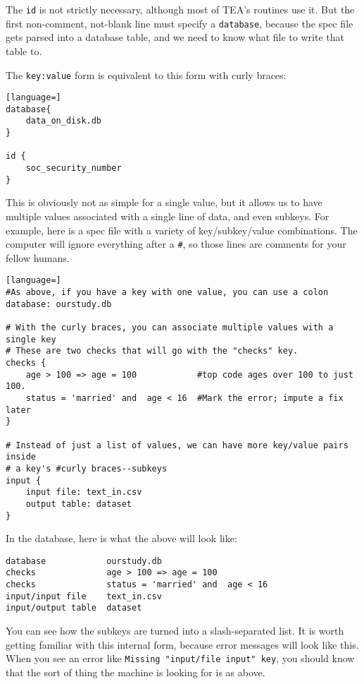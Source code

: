 \documentclass{article}
\begin{document}
The {\tt id} is not strictly necessary, although most of TEA's routines use it. But the
first non-comment, not-blank line must specify a {\tt database}, because the spec file
gets parsed into a database table, and we need to know what file to write that table to.

The {\tt key:value} form is equivalent to this form with curly braces:

\begin{lstlisting}[language=]
database{ 
    data_on_disk.db
}

id { 
    soc_security_number
}
\end{lstlisting}

This is obviously not as simple for a single value, but it allows us to have multiple
values associated with a single line of data, and even subkeys. For example, here is
a spec file with a variety of key/subkey/value combinations. The computer will ignore
everything after a {\tt \#}, so those lines are comments for your fellow humans.

\begin{lstlisting}[language=]
#As above, if you have a key with one value, you can use a colon
database: ourstudy.db

# With the curly braces, you can associate multiple values with a single key
# These are two checks that will go with the "checks" key.
checks {
    age > 100 => age = 100            #top code ages over 100 to just 100.
    status = 'married' and  age < 16  #Mark the error; impute a fix later
}

# Instead of just a list of values, we can have more key/value pairs inside 
# a key's #curly braces--subkeys
input { 
    input file: text_in.csv
    output table: dataset
}

\end{lstlisting}

In the database, here is what the above will look like:
\begin{verbatim}
database            ourstudy.db
checks              age > 100 => age = 100
checks              status = 'married' and  age < 16
input/input file    text_in.csv
input/output table  dataset
\end{verbatim}
You can see how the subkeys are turned into a slash-separated list. It is worth getting
familiar with this internal form, because error messages will look like this. When you
see an error like {\tt Missing "input/file input" key}, you should know that the sort of
thing the machine is looking for is as above.
\end{document}
